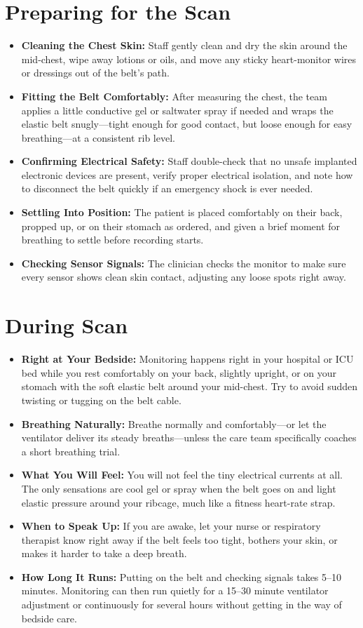 \section{Preparing for the Scan}
\begin{itemize}
    \item \textbf{Cleaning the Chest Skin:} Staff gently clean and dry the skin around the mid-chest, wipe away lotions or oils, and move any sticky heart-monitor wires or dressings out of the belt's path.
    \item \textbf{Fitting the Belt Comfortably:} After measuring the chest, the team applies a little conductive gel or saltwater spray if needed and wraps the elastic belt snugly---tight enough for good contact, but loose enough for easy breathing---at a consistent rib level.
    \item \textbf{Confirming Electrical Safety:} Staff double-check that no unsafe implanted electronic devices are present, verify proper electrical isolation, and note how to disconnect the belt quickly if an emergency shock is ever needed.
    \item \textbf{Settling Into Position:} The patient is placed comfortably on their back, propped up, or on their stomach as ordered, and given a brief moment for breathing to settle before recording starts.
    \item \textbf{Checking Sensor Signals:} The clinician checks the monitor to make sure every sensor shows clean skin contact, adjusting any loose spots right away.
\end{itemize}

\section{During Scan}
\begin{itemize}
    \item \textbf{Right at Your Bedside:} Monitoring happens right in your hospital or ICU bed while you rest comfortably on your back, slightly upright, or on your stomach with the soft elastic belt around your mid-chest. Try to avoid sudden twisting or tugging on the belt cable.
    \item \textbf{Breathing Naturally:} Breathe normally and comfortably---or let the ventilator deliver its steady breaths---unless the care team specifically coaches a short breathing trial.
    \item \textbf{What You Will Feel:} You will not feel the tiny electrical currents at all. The only sensations are cool gel or spray when the belt goes on and light elastic pressure around your ribcage, much like a fitness heart-rate strap.
    \item \textbf{When to Speak Up:} If you are awake, let your nurse or respiratory therapist know right away if the belt feels too tight, bothers your skin, or makes it harder to take a deep breath.
    \item \textbf{How Long It Runs:} Putting on the belt and checking signals takes 5--10 minutes. Monitoring can then run quietly for a 15--30 minute ventilator adjustment or continuously for several hours without getting in the way of bedside care.
\end{itemize}

